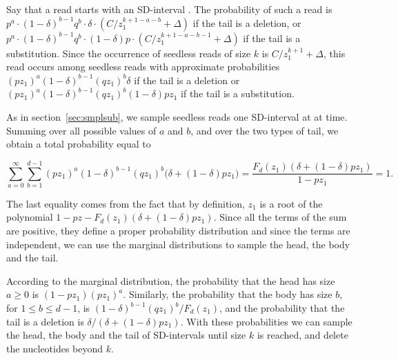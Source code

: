 \documentclass{article}
\begin{document}
Say that a read starts with an SD-interval 
. The
probability of such a read is $p^a \cdot (1-\delta)^{b-1}q^b \cdot
\delta \cdot (C/z_1^{k+1-a-b} + \Delta)$ if the tail is a deletion, or
$p^a \cdot (1-\delta)^{b-1}q^b \cdot (1-\delta)p \cdot (C/z_1^{k+1-a-b-1}
+ \Delta)$ if the tail is a substitution. Since the occurrence of
seedless reads of size $k$ is $C/z_1^{k+1} + \Delta$, this read occurs
among seedless reads with approximate probabilities $(pz_1)^a
(1-\delta)^{b-1}(qz_1)^b \delta$ if the tail is a deletion or $(pz_1)^a
(1-\delta)^{b-1}(qz_1)^b (1-\delta)pz_1$ if the tail is a substitution.

As in section~\ref{sec:smplsub}, we sample seedless reads one SD-interval
at at time. Summing over all possible values of $a$ and $b$, and over the
two types of tail, we obtain a total probability equal to

\begin{equation*}
\sum_{a=0}^\infty \sum_{b=1}^{d-1} (pz_1)^a (1-\delta)^{b-1}(qz_1)^b
\big(\delta + (1-\delta)pz_1 \big) = \frac{F_d(z_1)(\delta +
(1-\delta)pz_1)}{1-pz_1} = 1.
\end{equation*}

The last equality comes from the fact that by definition, $z_1$ is a root
of the polynomial $1-pz-F_d(z_1)(\delta +(1-\delta)pz_1)$. Since all the
terms of the sum are positive, they define a proper probability
distribution and since the terms are independent, we can use the marginal
distributions to sample the head, the body and the tail.

According to the marginal distribution, the probability that the head has
size $a \geq 0$ is $(1-pz_1)(pz_1)^a$. Similarly, the probability that the
body has size $b$, for $1 \leq b \leq d-1$, is $(1-\delta)^{b-1}(qz_1)^b /
F_d(z_1)$, and the probability that the tail is a deletion is $\delta /
(\delta + (1-\delta)pz_1)$. With these probabilities we can sample the
head, the body and the tail of SD-intervals until size $k$ is
reached, and delete the nucleotides beyond $k$.
\end{document}
